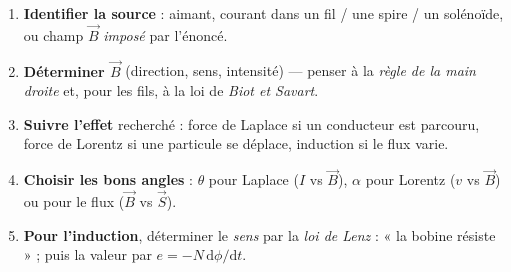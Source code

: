 \documentclass[11pt,a4paper]{article}
\newcommand{\Bvec}{\vec{B}}
\newcommand{\Svec}{\vec{S}}
\newcommand{\dd}{\mathrm{d}}
\begin{document}
\begin{methode}
\begin{enumerate}[leftmargin=1.8em,topsep=2pt,itemsep=1pt]
  \item \textbf{Identifier la source} : aimant, courant dans un fil / une spire / un solénoïde, ou
        champ $\Bvec$ \emph{imposé} par l'énoncé.
  \item \textbf{Déterminer $\Bvec$} (direction, sens, intensité) — penser à la \emph{règle de la
        main droite} et, pour les fils, à la loi de \emph{Biot et Savart}.
  \item \textbf{Suivre l'effet} recherché : force de Laplace si un conducteur est parcouru,
        force de Lorentz si une particule se déplace, induction si le flux varie.
  \item \textbf{Choisir les bons angles} : $\theta$ pour Laplace ($I$ vs $\Bvec$), $\alpha$ pour
        Lorentz ($v$ vs $\Bvec$) ou pour le flux ($\Bvec$ vs $\Svec$).
  \item \textbf{Pour l'induction}, déterminer le \emph{sens} par la \emph{loi de Lenz} : « la bobine
        résiste » ; puis la valeur par $e=-N\,\dd\phi/\dd t$.
\end{enumerate}
\end{methode}
\end{document}
